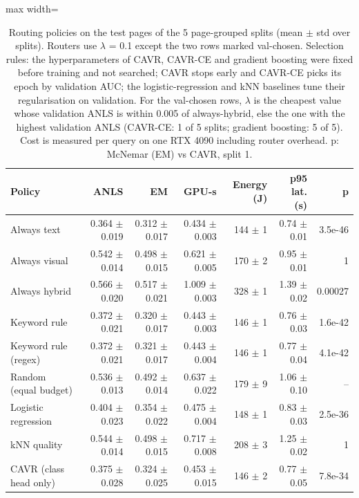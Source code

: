 \begin{table}[t]
\centering
\caption{Routing policies on the test pages of the 5 page-grouped splits (mean $\pm$ std over splits). Routers use $\lambda$ = 0.1 except the two rows marked val-chosen. Selection rules: the hyperparameters of CAVR, CAVR-CE and gradient boosting were fixed before training and not searched; CAVR stops early and CAVR-CE picks its epoch by validation AUC; the logistic-regression and kNN baselines tune their regularisation on validation. For the val-chosen rows, $\lambda$ is the cheapest value whose validation ANLS is within 0.005 of always-hybrid, else the one with the highest validation ANLS (CAVR-CE: 1 of 5 splits; gradient boosting: 5 of 5). Cost is measured per query on one RTX 4090 including router overhead. p: McNemar (EM) vs CAVR, split 1.}
\label{tab:main_results}
\begin{adjustbox}{max width=\linewidth}
\begin{tabular}{lrrrrrr}
\toprule
\textbf{Policy} & \textbf{ANLS} & \textbf{EM} & \textbf{GPU-s} & \textbf{Energy (J)} & \textbf{p95 lat. (s)} & \textbf{p} \\
\midrule
Always text & 0.364 $\pm$ 0.019 & 0.312 $\pm$ 0.017 & 0.434 $\pm$ 0.003 & 144 $\pm$ 1 & 0.74 $\pm$ 0.01 & 3.5e-46 \\
Always visual & 0.542 $\pm$ 0.014 & 0.498 $\pm$ 0.015 & 0.621 $\pm$ 0.005 & 170 $\pm$ 2 & 0.95 $\pm$ 0.01 & 1 \\
Always hybrid & 0.566 $\pm$ 0.020 & 0.517 $\pm$ 0.021 & 1.009 $\pm$ 0.003 & 328 $\pm$ 1 & 1.39 $\pm$ 0.02 & 0.00027 \\
Keyword rule & 0.372 $\pm$ 0.021 & 0.320 $\pm$ 0.017 & 0.443 $\pm$ 0.003 & 146 $\pm$ 1 & 0.76 $\pm$ 0.03 & 1.6e-42 \\
Keyword rule (regex) & 0.372 $\pm$ 0.021 & 0.321 $\pm$ 0.017 & 0.443 $\pm$ 0.004 & 146 $\pm$ 1 & 0.77 $\pm$ 0.04 & 4.1e-42 \\
Random (equal budget) & 0.536 $\pm$ 0.013 & 0.492 $\pm$ 0.014 & 0.637 $\pm$ 0.022 & 179 $\pm$ 9 & 1.06 $\pm$ 0.10 & -- \\
Logistic regression & 0.404 $\pm$ 0.023 & 0.354 $\pm$ 0.022 & 0.475 $\pm$ 0.004 & 148 $\pm$ 1 & 0.83 $\pm$ 0.03 & 2.5e-36 \\
kNN quality & 0.544 $\pm$ 0.014 & 0.498 $\pm$ 0.015 & 0.717 $\pm$ 0.008 & 208 $\pm$ 3 & 1.25 $\pm$ 0.02 & 1 \\
CAVR (class head only) & 0.375 $\pm$ 0.028 & 0.324 $\pm$ 0.025 & 0.453 $\pm$ 0.015 & 146 $\pm$ 2 & 0.77 $\pm$ 0.05 & 7.8e-34 \\

\end{tabular}
\end{adjustbox}
\end{table}
